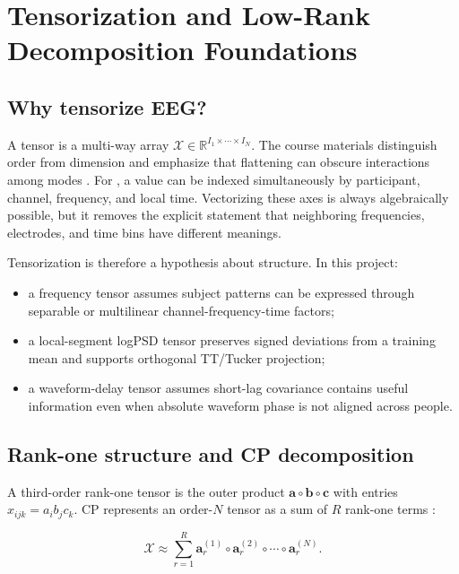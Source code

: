 \chapter{Tensorization and Low-Rank Decomposition Foundations}
\label{ch:tensors}

\section{Why tensorize EEG?}

A tensor is a multi-way array $\mathcal{X}\in\mathbb{R}^{I_1\times\cdots\times I_N}$.
The course materials distinguish order from dimension and emphasize that
flattening can obscure interactions among modes \citep{padhy2026course}. For
\EEG{}, a value can be indexed simultaneously by participant, channel,
frequency, and local time. Vectorizing these axes is always algebraically
possible, but it removes the explicit statement that neighboring frequencies,
electrodes, and time bins have different meanings.

Tensorization is therefore a hypothesis about structure. In this project:

\begin{itemize}
  \item a frequency tensor assumes subject patterns can be expressed through
  separable or multilinear channel-frequency-time factors;
  \item a local-segment logPSD tensor preserves signed deviations from a
  training mean and supports orthogonal TT/Tucker projection;
  \item a waveform-delay tensor assumes short-lag covariance contains useful
  information even when absolute waveform phase is not aligned across people.
\end{itemize}

\section{Rank-one structure and CP decomposition}

A third-order rank-one tensor is the outer product
$\bm{a}\circ\bm{b}\circ\bm{c}$ with entries
$x_{ijk}=a_i b_j c_k$. CP represents an order-$N$ tensor as a sum of $R$
rank-one terms \citep{kolda2009tensor}:

\begin{equation}
\mathcal{X}\approx\sum_{r=1}^{R}
\bm{a}^{(1)}_r\circ\bm{a}^{(2)}_r\circ\cdots\circ\bm{a}^{(N)}_r.
\label{eq:cp}
\end{equation}

